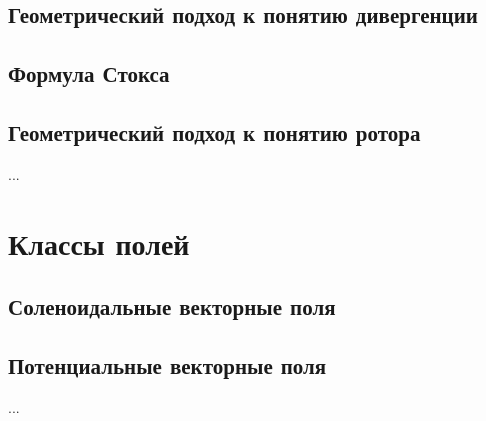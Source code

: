 \subsection{Геометрический подход к понятию дивергенции}
\subsection{Формула Стокса}
\subsection{Геометрический подход к понятию ротора}
...

\section{Классы полей}
\subsection{Соленоидальные векторные поля}
\subsection{Потенциальные векторные поля}
...

